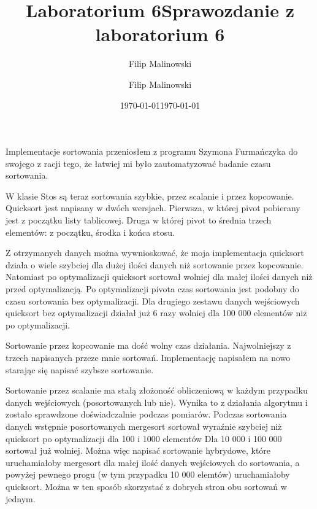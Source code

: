 \documentclass[a4paper,10pt]{scrartcl}
\title{Laboratorium 6}
\author{Filip Malinowski}
\date{\today}
\begin{document}
\title{Sprawozdanie z laboratorium 6}
\author{Filip Malinowski}
\date{\today}

\maketitle


Implementacje sortowania przeniosłem z programu
Szymona Furmańczyka do swojego z racji tego, że
łatwiej mi było zautomatyzować badanie czasu
sortowania.

W klasie Stos są teraz sortowania szybkie, przez
scalanie i przez kopcowanie. Quicksort jest napisany
w dwóch wersjach. Pierwsza, w której pivot pobierany
jest z początku listy tablicowej. Druga w której 
pivot to średnia trzech elementów: z początku,
środka i końca stosu.

Z otrzymanych danych można wywnioskować, że moja implementacja
quicksort działa o wiele szybciej dla dużej ilości danych 
niż sortowanie przez kopcowanie. Natomiast po optymalizacji
quicksort sortował wolniej dla małej ilości danych niż przed
optymalizacją. Po optymalizacji pivota czas sortowania jest
podobny do czasu sortowania bez optymalizacji.
Dla drugiego zestawu danych wejściowych quicksort bez optymalizacji
działał już 6 razy wolniej dla 100 000 elementów niż po optymalizacji.

Sortowanie przez kopcowanie ma dość wolny czas działania.
Najwolniejszy z trzech napisanych przeze mnie sortowań.
Implementację napisałem na nowo starając się napisać szybsze
sortowanie.

Sortowanie przez scalanie ma stałą złożoność obliczeniową
w każdym przypadku danych wejściowych (posortowanych
lub nie). Wynika to z działania algorytmu i zostało
sprawdzone doświadczalnie podczas pomiarów.
Podczas sortowania danych wstępnie posortowanych
mergesort sortował wyraźnie szybciej niż
quicksort po optymalizacji dla 100 i 1000 elementów
Dla 10 000 i 100 000 sortował już wolniej.
Można więc napisać sortowanie hybrydowe, które
uruchamiałoby mergesort dla małej ilość danych
wejściowych do sortowania, a powyżej pewnego
progu (w tym przypadku 10 000 elemtów) uruchamiałoby
quicksort. Można w ten sposób skorzystać z
dobrych stron obu sortowań w jednym.

\pagebreak
\end{document}
